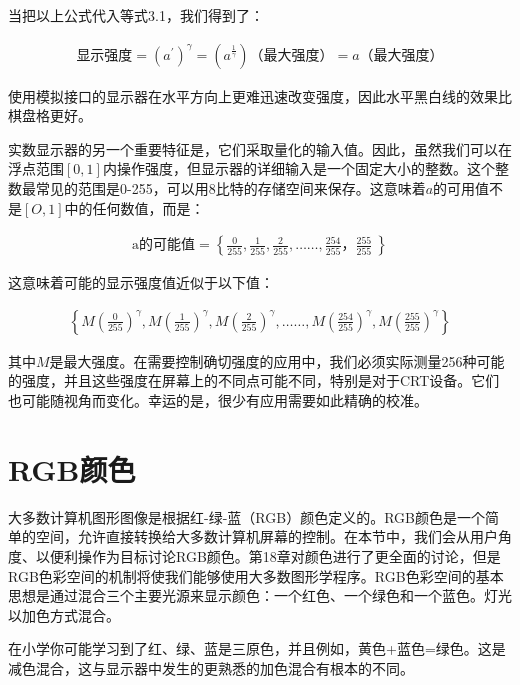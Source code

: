 \documentclass[lang=cn,12pt]{elegantbook}
\begin{document}
当把以上公式代入等式3.1，我们得到了：

\[
  \begin{aligned}
  \mbox{显示强度} = (a^{'})^\gamma = (a^{\frac{1}{\gamma}})\mbox{（最大强度）} = a\mbox{（最大强度）}
  \end{aligned}
\]

\begin{note}
使用模拟接口的显示器在水平方向上更难迅速改变强度，因此水平黑白线的效果比棋盘格更好。
\end{note}

实数显示器的另一个重要特征是，它们采取量化的输入值。因此，虽然我们可以在浮点范围$[0,1]$内操作强度，但显示器的详细输入是一个固定大小的整数。这个整数最常见的范围是0-255，可以用8比特的存储空间来保存。这意味着$a$的可用值不是$[O,1]$中的任何数值，而是：

\[
  \begin{aligned}
  \mbox{a的可能值} = \left\{ \frac{0}{255},\frac{1}{255},\frac{2}{255},……,\frac{254}{255}，\frac{255}{255}\ \right\}
  \end{aligned}
\]

这意味着可能的显示强度值近似于以下值：

\[
  \begin{aligned}
    \left\{ M(\frac{0}{255})^\gamma ,M(\frac{1}{255})^\gamma ,M(\frac{2}{255})^\gamma ,……,M(\frac{254}{255})^\gamma ,M(\frac{255}{255})^\gamma \right\}
  \end{aligned}
\]

其中$M$是最大强度。在需要控制确切强度的应用中，我们必须实际测量256种可能的强度，并且这些强度在屏幕上的不同点可能不同，特别是对于CRT设备。它们也可能随视角而变化。幸运的是，很少有应用需要如此精确的校准。

\section{RGB颜色}

大多数计算机图形图像是根据红-绿-蓝（RGB）颜色定义的。RGB颜色是一个简单的空间，允许直接转换给大多数计算机屏幕的控制。在本节中，我们会从用户角度、以便利操作为目标讨论RGB颜色。第18章对颜色进行了更全面的讨论，但是RGB色彩空间的机制将使我们能够使用大多数图形学程序。RGB色彩空间的基本思想是通过混合三个主要光源来显示颜色：一个红色、一个绿色和一个蓝色。灯光以加色方式混合。

\begin{note}
在小学你可能学习到了红、绿、蓝是三原色，并且例如，黄色+蓝色=绿色。这是减色混合，这与显示器中发生的更熟悉的加色混合有根本的不同。
\end{note}
\end{document}
